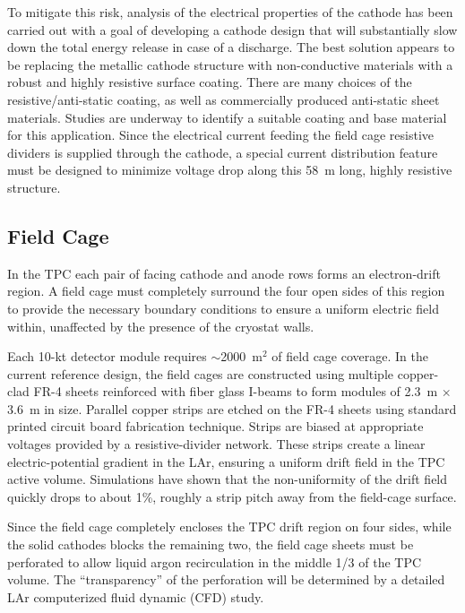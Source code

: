 To mitigate this risk, analysis of the electrical properties of the
cathode has been carried out with a goal of developing a cathode
design that will substantially slow down the total energy release in
case of a discharge.  The best solution appears to be replacing the
metallic cathode structure with non-conductive materials with a robust
and highly resistive surface coating.  There are many choices of the
resistive/anti-static coating, as well as commercially produced
anti-static sheet materials.  Studies are underway to identify a
suitable coating and base material for this application.  Since the
electrical current feeding the field cage resistive dividers is
supplied through the cathode, a special current distribution feature
must be designed to minimize voltage drop along this 58~m long, highly
resistive structure.


\subsection{Field Cage}
\label{subsec:fd-ref-fieldcage}

In the TPC each pair of facing cathode and anode rows forms an
electron-drift region. A field cage must completely surround the four
open sides of this region to provide the necessary boundary conditions
to ensure a uniform electric field within, unaffected by the presence
of the cryostat walls.


Each 10-kt detector module requires $\sim$2000~m$^2$ of field
cage coverage. In the current reference design, the field cages are
constructed using multiple copper-clad FR-4 sheets reinforced with
fiber glass I-beams to form modules of 2.3~m $\times$ 3.6~m in
size. Parallel copper strips are etched on the FR-4 sheets using
standard printed circuit board fabrication technique. Strips are
biased at appropriate voltages provided by a resistive-divider
network. These strips create a linear electric-potential gradient in
the LAr, ensuring a uniform drift field in the TPC active volume.
Simulations have shown that the non-uniformity of the drift field quickly
drops to about 1\%, roughly a strip pitch away from the field-cage
surface.

Since the field cage completely encloses the TPC drift region on four
sides, while the solid cathodes blocks the remaining two, the field
cage sheets must be perforated to allow liquid argon recirculation in
the middle 1/3 of the TPC volume. The ``transparency'' of the
perforation will be determined by a detailed LAr computerized fluid
dynamic (CFD) study.

